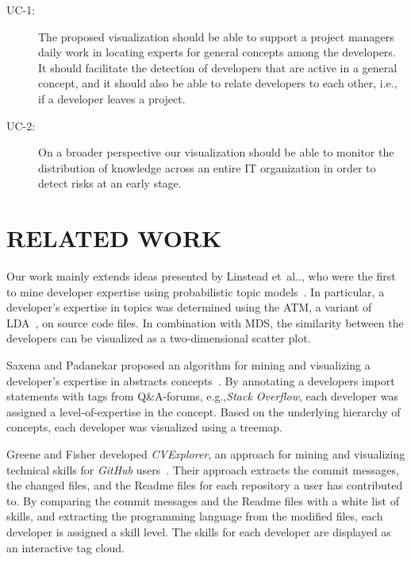 \documentclass[a4paper,twoside]{article}
\makeatletter
\DeclareRobustCommand\onedot{\futurelet\@let@token\@onedot}
\def\@onedot{\ifx\@let@token.\else.\null\fi\xspace}
\def\etal{et~al\onedot\xspace}
\def\ie{i.e.,\xspace}
\def\eg{e.g.,\xspace}
\makeatother
\begin{document}
\begin{description}
\item[UC-1:] The proposed visualization should be able to support a project managers daily work in locating experts for general concepts among the developers.
It should facilitate the detection of developers that are active in a general concept, and it should also be able to relate developers to each other, \ie if a developer leaves a project.
\item[UC-2:] On a broader perspective our visualization should be able to monitor the distribution of knowledge across an entire IT organization in order to detect risks at an early stage.
\end{description}

\section{\uppercase{Related Work}}
\label{KM:Sec:RelatedWork}

\noindent Our work mainly extends ideas presented by Linstead \etal, who were the first to mine developer expertise using probabilistic topic models~\cite{linstead2007eclipseeeveloper,linstead09sourcerer}.
In particular, a developer's expertise in topics was determined using the \ac{ATM}, a variant of \ac{LDA}~\cite{rosen-zvi2004authors}, on  source code files.
In combination with \ac{MDS}, the similarity between the developers can be visualized as a two-dimensional scatter plot.

Saxena and Padanekar proposed an algorithm for mining and visualizing a developer's expertise in abstracts concepts~\cite{saxena2017know}.
By annotating a developers import statements with tags from Q\&A-forums, \eg \textit{Stack Overflow}, each developer was assigned a level-of-expertise in the concept.
Based on the underlying hierarchy of concepts, each developer was visualized using a treemap.

Greene and Fisher developed \textit{CVExplorer}, an approach for mining and visualizing technical skills for \textit{GitHub} users~\cite{greene2016cvexplorer}.
Their approach extracts the commit messages, the changed files, and the Readme files for each repository a user has contributed to.
By comparing the commit messages and the Readme files with a white list of skills, and extracting the programming language from the modified files, each developer is assigned a skill level.
The skills for each developer are displayed as an interactive tag cloud.
\end{document}
